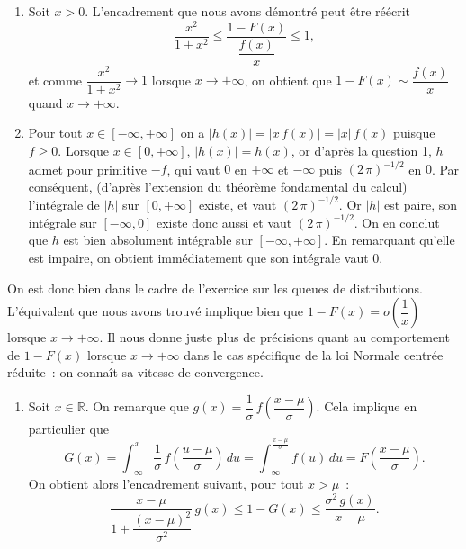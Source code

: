 \label{I-answer-fdrgaussequi}

\begin{enumerate}
\def\labelenumi{\arabic{enumi}.}
\setcounter{enumi}{4}
\item
  Soit \(x>0\). L'encadrement que nous avons démontré peut être réécrit
  \[ \dfrac{x^2}{1+x^2} \leq \dfrac{1-F(x)}{\dfrac{f(x)}{x}} \leq 1, \]
  et comme \(\dfrac{x^2}{1+x^2} \to 1\) lorsque \(x\to+\infty\), on
  obtient que \(1-F(x) \sim \dfrac{f(x)}{x}\) quand \(x\to+\infty\).
\item
  Pour tout \(x \in [-\infty,+\infty]\) on a
  \(\left|h(x)\right| = \left|x\,f(x)\right| = |x|\,f(x)\) puisque
  \(f\geq 0\). Lorsque \(x \in [0,+\infty]\),
  \(\left|h(x)\right| = h(x)\), or d'après la question 1, \(h\) admet
  pour primitive \(-f\), qui vaut \(0\) en \(+\infty\) et \(-\infty\)
  puis \((2\,\pi)^{-1/2}\) en \(0\). Par conséquent, (d'après
  l'extension du \href{Calcul\%20Intégral\%20I.pdf\%20\#TFC}{théorème
  fondamental du calcul}) l'intégrale de \(\left|h\right|\) sur
  \([0,+\infty]\) existe, et vaut \((2\,\pi)^{-1/2}\). Or
  \(\left|h\right|\) est paire, son intégrale sur \([-\infty,0]\) existe
  donc aussi et vaut \((2\,\pi)^{-1/2}\). On en conclut que \(h\) est
  bien absolument intégrable sur \([-\infty,+\infty]\). En remarquant
  qu'elle est impaire, on obtient immédiatement que son intégrale vaut
  \(0\).
\end{enumerate}

On est donc bien dans le cadre de l'exercice sur les queues de
distributions. L'équivalent que nous avons trouvé implique bien que
\(1-F(x) = o\left(\dfrac{1}{x} \right)\) lorsque \(x\to+\infty\). Il
nous donne juste plus de précisions quant au comportement de \(1-F(x)\)
lorsque \(x\to+\infty\) dans le cas spécifique de la loi Normale centrée
réduite~: on connaît sa vitesse de convergence.

\label{I-answer-fdrgaussgen}

\begin{enumerate}
\def\labelenumi{\arabic{enumi}.}
\setcounter{enumi}{6}
\tightlist
\item
  Soit \(x\in\mathbb{R}\). On remarque que
  \(g(x) = \dfrac{1}{\sigma}\,f\left(\dfrac{x-\mu}{\sigma} \right)\).
  Cela implique en particulier que
  \[G(x) =  \int_{-\infty}^x \dfrac{1}{\sigma}\,f\left(\dfrac{u-\mu}{\sigma} \right)\,du = \int_{-\infty}^{\frac{x-\mu}{\sigma}} f(u)\,du = F\left(\dfrac{x-\mu}{\sigma}\right).\]
  On obtient alors l'encadrement suivant, pour tout \(x>\mu\)~:
  \[ \dfrac{x-\mu}{1 + \dfrac{(x-\mu)^2}{\sigma^2}}\,g(x) \leq 1 - G(x) \leq \dfrac{\sigma^2\,g(x)}{x-\mu}.  \]
\end{enumerate}

